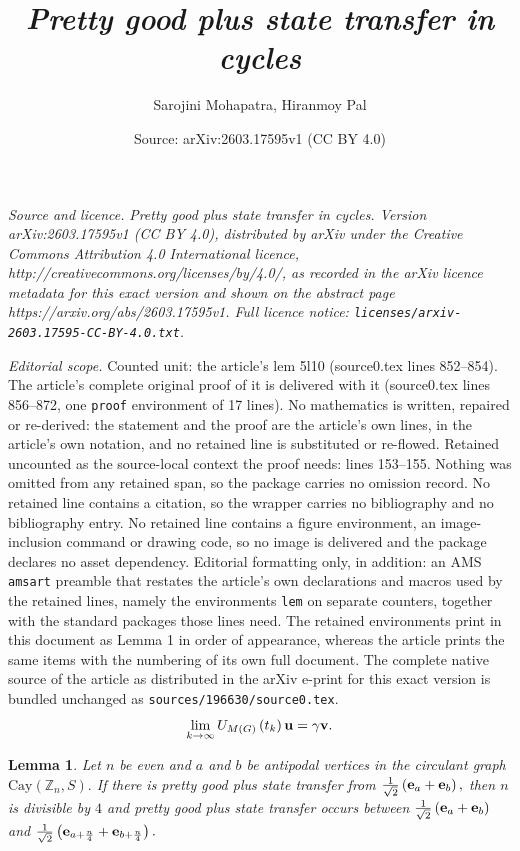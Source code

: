 \documentclass[10pt,a4paper]{amsart}
\title{\it Pretty good plus state transfer in cycles}
\author{Sarojini Mohapatra, Hiranmoy Pal}
\date{Source: arXiv:2603.17595v1 (CC BY 4.0)}
\newtheorem{lem}{Lemma}
\def \e {{\bf e}}
\newcommand{\ob}[1]{\left(#1\right)}
\def \u {{\bf u}}
\def \v {{\bf v}}
\begin{document}
\maketitle

\noindent\emph{Source and licence.} \it Pretty good plus state transfer in cycles. Version arXiv:2603.17595v1 (CC BY 4.0), distributed by arXiv under the Creative Commons Attribution 4.0 International licence, http://creativecommons.org/licenses/by/4.0/, as recorded in the arXiv licence metadata for this exact version and shown on the abstract page https://arxiv.org/abs/2603.17595v1. Full licence notice: \texttt{licenses/arxiv-2603.17595-CC-BY-4.0.txt}.\par\smallskip

\noindent\textit{Editorial scope.} Counted unit: the article's lem 5l10 (source0.tex lines 852--854). The article's complete original proof of it is delivered with it (source0.tex lines 856--872, one \texttt{proof} environment of 17 lines). No mathematics is written, repaired or re-derived: the statement and the proof are the article's own lines, in the article's own notation, and no retained line is substituted or re-flowed.  Retained uncounted as the source-local context the proof needs: lines 153--155.  Nothing was omitted from any retained span, so the package carries no omission record.  No retained line contains a citation, so the wrapper carries no bibliography and no bibliography entry.  No retained line contains a figure environment, an image-inclusion command or drawing code, so no image is delivered and the package declares no asset dependency.  Editorial formatting only, in addition: an AMS \texttt{amsart} preamble that restates the article's own declarations and macros used by the retained lines, namely the environments \texttt{lem} on separate counters, together with the standard packages those lines need.  The retained environments print in this document as Lemma 1 in order of appearance, whereas the article prints the same items with the numbering of its own full document.  The complete native source of the article as distributed in the arXiv e-print for this exact version is bundled unchanged as \texttt{sources/196630/source0.tex}.
\begin{equation}\label{5eq2}
       \lim_{k \to \infty}U_{M(G)}\ob{t_k}\u=\gamma \v.
   \end{equation}

\begin{lem}\label{5l10}
    Let $n$ be even and $a$ and $b$ be antipodal vertices in the circulant graph $\text{Cay}(\mathbb{Z}_n, S).$ If there is pretty good plus state transfer from $\frac{1}{\sqrt{2}}\ob{\e_a+\e_b},$ then $n$ is divisible by $4$ and pretty good plus state transfer occurs between $\frac{1}{\sqrt{2}}\ob{\e_a+\e_b}$ and $\frac{1}{\sqrt{2}}\ob{\e_{a+\frac{n}{4}}+\e_{b+\frac{n}{4}}}.$  
\end{lem}
\end{document}
